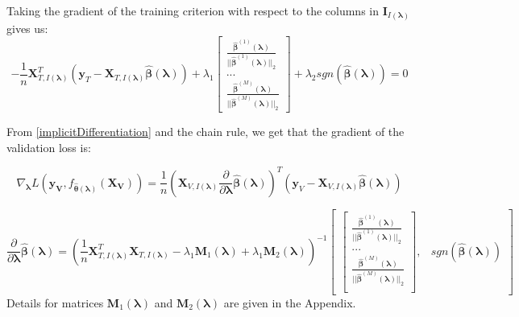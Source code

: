 \documentclass[10pt,letterpaper]{article}
\begin{document}
Taking the gradient of the training criterion with respect to the columns in $\boldsymbol I_{I(\boldsymbol\lambda)}$ gives us:
\begin{equation}
-\frac{1}{n} \boldsymbol{X}_{T, I(\boldsymbol\lambda)}^T(\boldsymbol{y}_T - \boldsymbol{X}_{T, I(\boldsymbol\lambda)} \hat{\boldsymbol\beta}(\boldsymbol \lambda))
+ \lambda_1
\begin{bmatrix}
\frac{\hat{\boldsymbol{\beta}}^{(1)} (\boldsymbol \lambda)}{||\hat{\boldsymbol{\beta}}^{(1)} (\boldsymbol \lambda)||_2}\\
...\\
\frac{\hat{\boldsymbol\beta}^{(M)}(\boldsymbol \lambda)}{||\hat{\boldsymbol{\beta}}^{(M)} (\boldsymbol \lambda)||_2}
\end{bmatrix}
+ \lambda_2 sgn(\hat{\boldsymbol\beta}(\boldsymbol \lambda)) =0
\end{equation}

From \eqref{implicitDifferentiation} and the chain rule, we get that the gradient of the validation loss is:

\begin{equation}
\nabla_{\boldsymbol \lambda} L(\boldsymbol{y_V}, f_{\hat{\boldsymbol{\theta}}(\boldsymbol{\lambda})}(\boldsymbol{X_V})) =
\frac{1}{n}
\left (
\boldsymbol{X}_{V, I(\boldsymbol\lambda)}
\frac{\partial}{\partial \boldsymbol\lambda} \hat{\boldsymbol{\beta}}(\boldsymbol{\lambda})
\right )^T
\left (
\boldsymbol{y}_V - \boldsymbol{X}_{V, I(\boldsymbol\lambda)} \hat{\boldsymbol{\beta}}(\boldsymbol{\lambda})
\right )
\end{equation}

\begin{equation}
\frac{\partial}{\partial \boldsymbol\lambda} \hat{\boldsymbol{\beta}}(\boldsymbol{\lambda}) =
\left (
\frac{1}{n} \boldsymbol{X}_{T, I(\boldsymbol\lambda)}^T \boldsymbol{X}_{T, I(\boldsymbol\lambda)} - \lambda_1 \boldsymbol{M}_1(\boldsymbol\lambda) + \lambda_1 \boldsymbol{M}_2(\boldsymbol\lambda)
\right ) ^{-1}
\begin{bmatrix}
\begin{bmatrix}
\frac{\hat{\boldsymbol{\beta}}^{(1)}(\boldsymbol \lambda)}{||\hat{\boldsymbol{\beta}}^{(1)} (\boldsymbol \lambda)||_2}\\
...\\
\frac{\hat{\boldsymbol \beta}^{(M)} (\boldsymbol \lambda)}{||\hat{\boldsymbol{\beta}}^{(M)}(\boldsymbol \lambda)||_2}\\
\end{bmatrix},
&
sgn(\hat{\boldsymbol{\beta}}(\boldsymbol{\lambda}))
\end{bmatrix}
\end{equation}
Details for matrices $\boldsymbol{M}_1(\boldsymbol\lambda)$ and $\boldsymbol{M}_2(\boldsymbol\lambda)$ are given in the Appendix.
\end{document}
